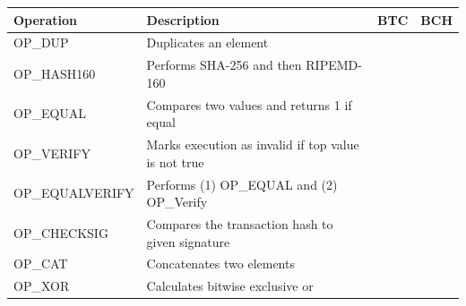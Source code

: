 \documentclass{cacthesis}
\newcommand{\cmark}{\ding{51}}%
\newcommand{\xmark}{\ding{55}}%
\begin{document}
        \begin{center}
            \begin{tabular}{ l | l | c | c }
             Operation  & Description & BTC & BCH \\ 
             \hline
             OP\_DUP & Duplicates an element & \cmark & \cmark \\
             OP\_HASH160 & Performs SHA-256 and then RIPEMD-160 & \cmark & \cmark  \\
             OP\_EQUAL & Compares two values and returns 1 if equal & \cmark & \cmark \\
             OP\_VERIFY & Marks execution as invalid if top value is not true & \cmark & \cmark \\
             OP\_EQUALVERIFY & Performs (1) OP\_EQUAL and (2) OP\_Verify & \cmark & \cmark \\
             OP\_CHECKSIG  & Compares the transaction hash to given signature & \cmark & \cmark \\
             OP\_CAT  & Concatenates two elements &  \xmark & \cmark \\
             OP\_XOR  & Calculates bitwise exclusive or & \xmark & \cmark \\
            \end{tabular}
            \label{tbl:opcodes}
        \end{center}
        
\end{document}
